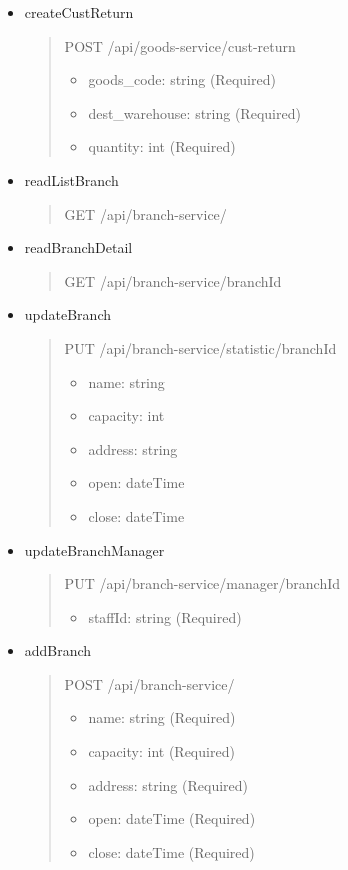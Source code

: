 \begin{itemize}
	\item createCustReturn
	      \begin{quote}
		      POST /api/goods-service/cust-return
			  \begin{itemize}
				\item goods\_code: string (Required)
				\item dest\_warehouse: string (Required)
				\item quantity: int (Required)
			  \end{itemize}
	      \end{quote}
\end{itemize}

\begin{itemize}
	\item readListBranch
	\begin{quote}
		GET /api/branch-service/
	\end{quote}


	\item readBranchDetail
	\begin{quote}
		GET /api/branch-service/{branchId}
	\end{quote}

	\item updateBranch
	\begin{quote}
		PUT /api/branch-service/statistic/{branchId}
		\begin{itemize}
			\item name: string
			\item capacity: int 
			\item address: string
			\item open: dateTime
			\item close: dateTime
		\end{itemize}
	\end{quote}

	\item updateBranchManager
	\begin{quote}
		PUT /api/branch-service/manager/{branchId}
		\begin{itemize}
			\item staffId: string (Required)
		\end{itemize}
	\end{quote}

	\item addBranch
	\begin{quote}
		POST /api/branch-service/
		\begin{itemize}
			\item name: string (Required)
			\item capacity: int (Required)
			\item address: string (Required)
			\item open: dateTime (Required)
			\item close: dateTime (Required)
		\end{itemize}
	\end{quote}


\end{itemize}
